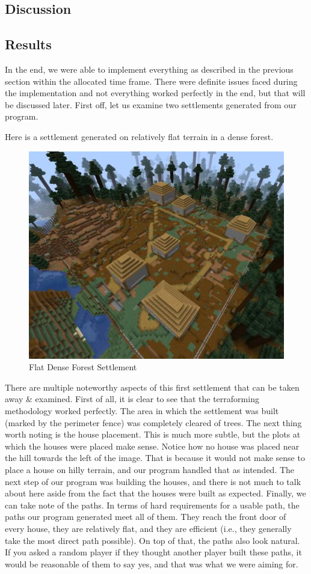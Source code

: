 \documentclass[11pt, oneside]{article}
\begin{document}
\begin{normalsize}
\section{Discussion}
\label{Discussion}

\subsection{Results}

In the end, we were able to implement everything as described in the previous section within the allocated time frame. 
There were definite issues faced during the implementation and not everything worked perfectly in the end, but that will be discussed later. 
First off, let us examine two settlements generated from our program. 

Here is a settlement generated on relatively flat terrain in a dense forest. 
\begin{figure}[H]
    \centering
    \includegraphics[width=0.75\linewidth]{village1}
    \caption{Flat Dense Forest Settlement}
    \label{fig:env}
\end{figure}

There are multiple noteworthy aspects of this first settlement that can be taken away \& examined. 
First of all, it is clear to see that the terraforming methodology worked perfectly. 
The area in which the settlement was built (marked by the perimeter fence) was completely cleared of trees. 
The next thing worth noting is the house placement. 
This is much more subtle, but the plots at which the houses were placed make sense.
Notice how no house was placed near the hill towards the left of the image. That is because it would not make sense to place a house on hilly terrain, and our program handled that as intended. 
The next step of our program was building the houses, and there is not much to talk about here aside from the fact that the houses were built as expected. 
Finally, we can take note of the paths. 
In terms of hard requirements for a usable path, the paths our program generated meet all of them. 
They reach the front door of every house, they are relatively flat, and they are efficient (i.e., they generally take the most direct path possible). 
On top of that, the paths also look natural. 
If you asked a random player if they thought another player built these paths, it would be reasonable of them to say yes, and that was what we were aiming for. 


\end{normalsize}
\end{document}
